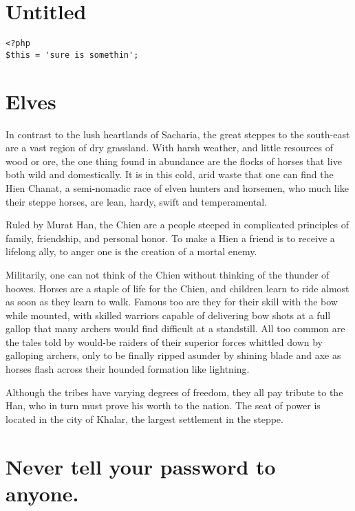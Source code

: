 \documentclass[a1paper]{article}
\begin{document}
\begin{multicols}{7}
{\section{Untitled}
\begin{verbatim}
<?php
$this = 'sure is somethin';
\end{verbatim}






\section{Elves}
In contrast to the lush heartlands of Sacharia, the great steppes to the south-east are a vast region of dry grassland. With harsh weather, and little resources of wood or ore, the one thing found in abundance are the flocks of horses that live both wild and domestically. It is in this cold, arid waste that one can find the Hien Chanat, a semi-nomadic race of elven hunters and horsemen, who much like their steppe horses, are lean, hardy, swift and temperamental.

Ruled by Murat Han, the Chien are a people steeped in complicated principles of family, friendship, and personal honor. 
To make a Hien a friend is to receive a lifelong ally, to anger one is the creation of a mortal enemy.

Militarily, one can not think of the Chien without thinking of the thunder of hooves. Horses are a staple of life for the Chien, and children learn to ride almost as soon as they learn to walk. 
Famous too are they for their skill with the bow while mounted, with skilled warriors capable of delivering bow shots at a full gallop that many archers would find difficult at a standstill. 
All too common are the tales told by would-be raiders of their superior forces whittled down by galloping archers, only to be finally ripped asunder by shining blade and axe as horses flash across their hounded formation like lightning.

Although the tribes have varying degrees of freedom, they all pay tribute to the Han, who in turn must prove his worth to the nation. The seat of power is located in the city of Khalar, the largest settlement in the steppe.




\section{Never tell your password to anyone.}
\setlength{\parskip}{0cm}

}
\end{multicols}
\end{document}
